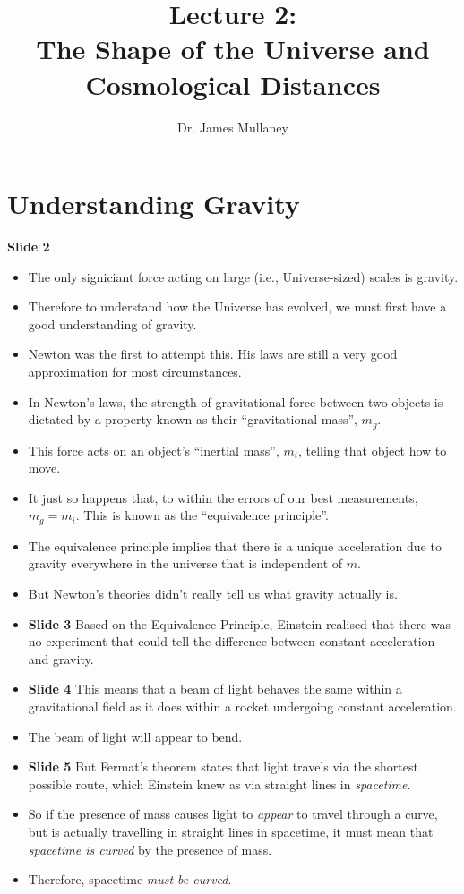 \documentclass[11pt]{article}
\begin{document}
 
\title{Lecture 2:\\The Shape of the Universe and Cosmological Distances}
\author{Dr. James Mullaney}
\maketitle

\section{Understanding Gravity}
{\bf Slide 2}
\begin{itemize}
\item The only signiciant force acting on large (i.e., Universe-sized) scales is gravity.
\item Therefore to understand how the Universe has evolved, we must first have a good understanding of gravity.
\item Newton was the first to attempt this. His laws are still a very good approximation for most circumstances.
\item In Newton's laws, the strength of gravitational force between two objects is dictated by a property known as their ``gravitational mass'', $m_g$.
\item This force acts on an object's ``inertial mass'', $m_i$, telling that object how to move.
\item It just so happens that, to within the errors of our best measurements, $m_g = m_i$. This is known as the ``equivalence principle''.
\item The equivalence principle implies that there is a unique acceleration due to gravity everywhere in the universe that is independent of $m$.
\item But Newton's theories didn't really tell us what gravity actually is.
\item {\bf Slide 3} Based on the Equivalence Principle, Einstein realised that there was no experiment that could tell the difference between constant acceleration and gravity.
\item {\bf Slide 4} This means that a beam of light behaves the same within a gravitational field as it does within a rocket undergoing constant acceleration.
\item The beam of light will appear to bend.
\item {\bf Slide 5} But Fermat's theorem states that light travels via the shortest possible route, which Einstein knew as via straight lines in {\it spacetime}.
\item So if the presence of mass causes light to {\it appear} to travel through a curve, but is actually travelling in straight lines in spacetime, it must mean that {\it spacetime is curved} by the presence of mass.
\item Therefore, spacetime {\it must be curved}.

\end{itemize}
\end{document}

